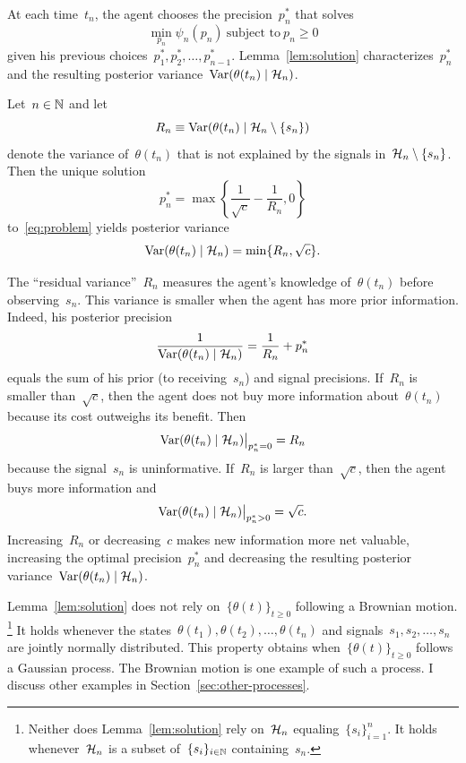 \documentclass[11pt,oneside]{article}
\begin{document}
At each time~$t_n$, the agent chooses the precision~$p_n^*$ that solves
%
\begin{equation}
    \min_{p_n}\psi_n(p_n)\ \text{subject to}\ p_n\ge0 \label{eq:problem}
\end{equation}
%
given his previous choices~$p_1^*,p_2^*,\ldots,p_{n-1}^*$.
Lemma~\ref{lem:solution} characterizes~$p_n^*$ and the resulting posterior variance~$\operatorname{Var}(\theta(t_n)\mid\mathcal{H}_n)$.

\begin{lemma}
    \label{lem:solution}
    Let~$n\in\mathbb{N}$ and let
    \[ R_n\equiv \operatorname{Var}(\theta(t_n)\mid\mathcal{H}_n\setminus\{s_n\}) \]
    denote the variance of~$\theta(t_n)$ that is not explained by the signals in~$\mathcal{H}_n\setminus\{s_n\}$.
    Then the unique solution
    \begin{equation}
        p_n^*=\max\left\{\frac{1}{\sqrt{c}}-\frac{1}{R_n},0\right\} \label{eq:optimal-precision}
    \end{equation}
    to~\eqref{eq:problem} yields posterior variance
    \[ \operatorname{Var}(\theta(t_n)\mid\mathcal{H}_n)=\min\{R_n,\sqrt{c}\}. \]
\end{lemma}
%

The ``residual variance''~$R_n$ measures the agent's knowledge of~$\theta(t_n)$ before observing~$s_n$.
This variance is smaller when the agent has more prior information.
Indeed, his posterior precision
\[ \frac{1}{\operatorname{Var}(\theta(t_n)\mid\mathcal{H}_n)}=\frac{1}{R_n}+p_n^* \]
equals the sum of his prior (to receiving~$s_n$) and signal precisions.
If~$R_n$ is smaller than~$\sqrt{c}$, then the agent does not buy more information about~$\theta(t_n)$ because its cost outweighs its benefit.
Then
\[ \operatorname{Var}(\theta(t_n)\mid\mathcal{H}_n)\big\rvert_{p_n^*=0}=R_n \]
because the signal~$s_n$ is uninformative.
If~$R_n$ is larger than~$\sqrt{c}$, then the agent buys more information and
\[ \operatorname{Var}(\theta(t_n)\mid\mathcal{H}_n)\big\rvert_{p_n^*>0}=\sqrt{c}. \]
Increasing~$R_n$ or decreasing~$c$ makes new information more net valuable, increasing the optimal precision~$p_n^*$ and decreasing the resulting posterior variance~$\operatorname{Var}(\theta(t_n)\mid\mathcal{H}_n)$.

Lemma~\ref{lem:solution} does not rely on~$\{\theta(t)\}_{t\ge0}$ following a Brownian motion.%
\footnote{
Neither does Lemma~\ref{lem:solution} rely on~$\mathcal{H}_n$ equaling~$\{s_i\}_{i=1}^n$.
It holds whenever~$\mathcal{H}_n$ is a subset of~$\{s_i\}_{i\in\mathbb{N}}$ containing~$s_n$.
}
It holds whenever the states~$\theta(t_1),\theta(t_2),\ldots,\theta(t_n)$ and signals~$s_1,s_2,\ldots,s_n$ are jointly normally distributed.
This property obtains when~$\{\theta(t)\}_{t\ge0}$ follows a Gaussian process.
The Brownian motion is one example of such a process.
I discuss other examples in Section~\ref{sec:other-processes}.
\end{document}
